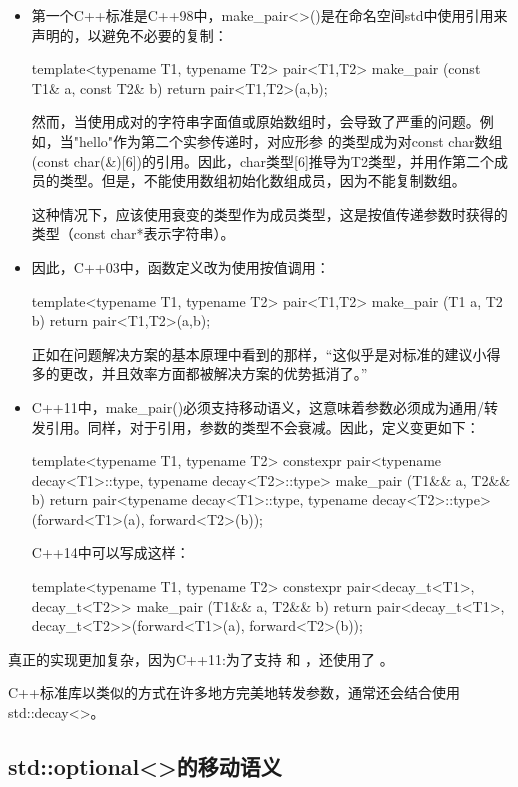 \begin{itemize}
\item 第一个C++标准是C++98中，make_pair<>()是在命名空间std中使用引用来声明的，以避免不必要的复制：
\begin{cppcode}
template<typename T1, typename T2>
pair<T1,T2> make_pair (const T1& a, const T2& b)
{
	return pair<T1,T2>(a,b);
}
\end{cppcode}
然而，当使用成对的字符串字面值或原始数组时，会导致了严重的问题。例如，当"hello"作为第二个实参传递时，对应形参  的类型成为对const char数组(const char(\&)[6])的引用。因此，char类型[6]推导为T2类型，并用作第二个成员的类型。但是，不能使用数组初始化数组成员，因为不能复制数组。

这种情况下，应该使用衰变的类型作为成员类型，这是按值传递参数时获得的类型（const char*表示字符串）。

\item 因此，C++03中，函数定义改为使用按值调用：
\begin{cppcode}
template<typename T1, typename T2>
pair<T1,T2> make_pair (T1 a, T2 b)
{
	return pair<T1,T2>(a,b);
}
\end{cppcode}
正如在问题解决方案的基本原理中看到的那样，“这似乎是对标准的建议小得多的更改，并且效率方面都被解决方案的优势抵消了。”

\item C++11中，make_pair()必须支持移动语义，这意味着参数必须成为通用/转发引用。同样，对于引用，参数的类型不会衰减。因此，定义变更如下：
\begin{cppcode}
template<typename T1, typename T2>
constexpr pair<typename decay<T1>::type, typename decay<T2>::type>
make_pair (T1&& a, T2&& b)
{
	return pair<typename decay<T1>::type,
	typename decay<T2>::type>(forward<T1>(a),
	forward<T2>(b));
}
\end{cppcode}
C++14中可以写成这样：
\begin{cppcode}
template<typename T1, typename T2>
constexpr pair<decay_t<T1>, decay_t<T2>>
make_pair (T1&& a, T2&& b)
{
	return pair<decay_t<T1>, decay_t<T2>>(forward<T1>(a), forward<T2>(b));
}
\end{cppcode}
\end{itemize}

真正的实现更加复杂，因为C++11:为了支持  和 ，还使用了 。

C++标准库以类似的方式在许多地方完美地转发参数，通常还会结合使用std::decay<>。

\subsection{std::optional<>的移动语义}

